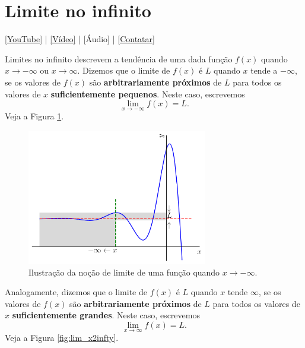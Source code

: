 \section{Limite no infinito}\label{cap_lim_sec_liminf}

\begin{flushright}
  \href{https://youtu.be/Ni9afaabTws}{[YouTube]} | \href{https://archive.org/details/video_20220713}{[Vídeo]} | [Áudio] | \href{https://phkonzen.github.io/notas/contato.html}{[Contatar]}
\end{flushright}

Limites no infinito descrevem a tendência de uma dada função $f(x)$ quando $x\to -\infty$ ou $x\to\infty$. Dizemos que o limite de $f(x)$ é $L$ quando $x$ tende a $-\infty$, se os valores de $f(x)$ são {\bf arbitrariamente próximos} de $L$ para todos os valores de $x$ {\bf suficientemente pequenos}. Neste caso, escrevemos
\begin{equation}
  \lim_{x\to -\infty} f(x) = L.
\end{equation}
Veja a Figura \ref{fig:lim_x-infty}.

\begin{figure}[H]
  \centering
  \includegraphics[width=0.7\textwidth]{./cap_lim/dados/fig_lim_x-infty/fig_lim_x-infty}
  \caption{Ilustração da noção de limite de uma função quando $x\to -\infty$.}
  \label{fig:lim_x-infty}
\end{figure}

Analogamente, dizemos que o limite de $f(x)$ é $L$ quando $x$ tende $\infty$, se os valores de $f(x)$ são {\bf arbitrariamente próximos} de $L$ para todos os valores de $x$ {\bf suficientemente grandes}. Neste caso, escrevemos
\begin{equation}
  \lim_{x\to \infty} f(x) = L.
\end{equation}
Veja a Figura \ref{fig:lim_x2infty}.

